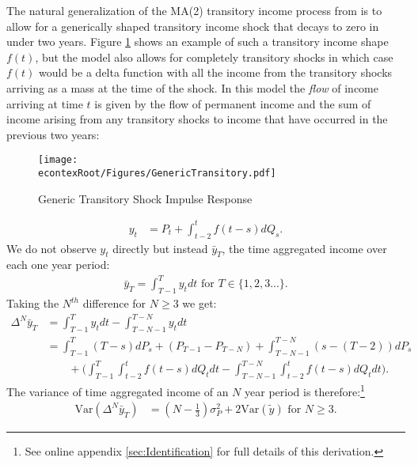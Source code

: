 \documentclass[titlepage]{\econtex}\newcommand{\texname}{ConsumptionHeterogeneity}
\begin{document}
	The natural generalization of the MA(2) transitory income process from \cite{carroll_nature_1997} is to allow for a generically shaped transitory income shock that decays to zero in under two years. Figure \ref{fig:GenericTransitory} shows an example of such a transitory income shape $f(t)$, but the model also allows for completely transitory shocks in which case $f(t)$ would be a delta function with all the income from the transitory shocks arriving as a mass at the time of the shock. In this model the \textit{flow} of income arriving at time $t$ is given by the flow of permanent income and the sum of income arising from any transitory shocks to income that have occurred in the previous two years:
	\begin{figure} 
		\begin{centering}
			\texttt{[image: \\econtexRoot/Figures/GenericTransitory.pdf]} 
			\caption{Generic Transitory Shock Impulse Response}
			\label{fig:GenericTransitory}
		\end{centering}
	\end{figure}
	\begin{align*}
	y_t &= P_t + \int_{t-2}^{t} f(t-s)dQ_s \text{.}
	\end{align*}
	We do not observe $y_t$ directly but instead $\bar{y}_T$, the time aggregated income over each one year period:
	\begin{align}
	\bar{y}_T = \int_{T-1}^{T} y_t dt \text{   for } T \in \{1,2,3...\} \text{.}\label{income_TA}
	\end{align}
	Taking the $N^{th}$ difference for $N \geq 3$ we get:
	\begingroup
	\allowdisplaybreaks[0]
	\begin{align}
	\Delta^N \bar{y}_T &= \int_{T-1}^{T} y_t dt  - \int_{T-N-1}^{T-N} y_t dt  \nonumber \\ 
	&= \int_{T-1}^{T} (T-s)dP_s  + (P_{T-1} - P_{T-N}) + \int_{T-N-1}^{T-N} (s-(T-2))dP_s \nonumber \\
	& \qquad + \Big(\int_{T-1}^{T} \int_{t-2}^{t} f(t-s)dQ_t dt -\int_{T-N-1}^{T-N}\int_{t-2}^{t} f(t-s) dQ_t dt \Big) \text{.}\label{deltaNy}
	\end{align}
	\endgroup
	The variance of time aggregated income of an $N$ year period is therefore:\footnote{See online appendix \ref{sec:Identification} for full details of this derivation.}
	\begin{align}
	\mathrm{Var}(\Delta^N \bar{y}_T) &= (N-\frac{1}{3})\sigma^2_P +  2 \mathrm{Var}(\tilde{y}) \text{   for }N \geq 3 \text{.}\label{variance}
	\end{align}
\end{document}
